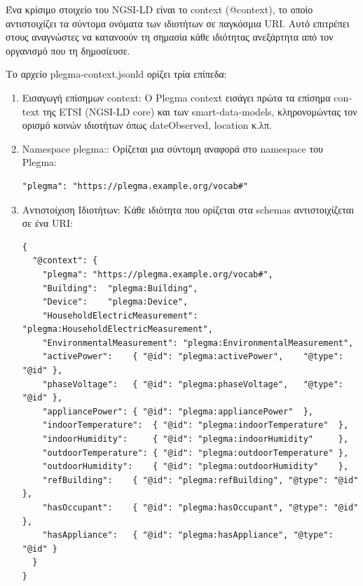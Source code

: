 Ένα κρίσιμο στοιχείο του \textlatin{NGSI-LD} είναι το \textlatin{context}
(\textlatin{@context}), το οποίο αντιστοιχίζει τα σύντομα ονόματα των
ιδιοτήτων σε παγκόσμια \textlatin{URI}. Αυτό επιτρέπει στους αναγνώστες
να κατανοούν τη σημασία κάθε ιδιότητας ανεξάρτητα από τον οργανισμό που τη
δημοσίευσε.

Το αρχείο \textlatin{plegma-context.jsonld} ορίζει τρία επίπεδα:

\begin{enumerate}
    \item Εισαγωγή επίσημων \textlatin{context}: Ο \textlatin{Plegma
    context} εισάγει πρώτα τα επίσημα \textlatin{context} της
    \textlatin{ETSI} (\textlatin{NGSI-LD core}) και των
    \textlatin{smart-data-models}, κληρονομώντας τον ορισμό κοινών
    ιδιοτήτων όπως \textlatin{dateObserved}, \textlatin{location} κ.λπ.

    \item \textlatin{Namespace} \textlatin{plegma:}: Ορίζεται μια
    σύντομη αναφορά στο \textlatin{namespace} του \textlatin{Plegma}:

\begin{lstlisting}[language={}]
"plegma": "https://plegma.example.org/vocab#"
\end{lstlisting}

    \item Αντιστοίχιση Ιδιοτήτων: Κάθε ιδιότητα που ορίζεται
    στα \textlatin{schemas} αντιστοιχίζεται σε ένα \textlatin{URI}:
\begin{lstlisting}[language={}, caption={Context mapping excerpt.}]
{
  "@context": {
    "plegma": "https://plegma.example.org/vocab#",
    "Building":  "plegma:Building",
    "Device":    "plegma:Device",
    "HouseholdElectricMeasurement": "plegma:HouseholdElectricMeasurement",
    "EnvironmentalMeasurement": "plegma:EnvironmentalMeasurement",
    "activePower":    { "@id": "plegma:activePower",    "@type": "@id" },
    "phaseVoltage":   { "@id": "plegma:phaseVoltage",   "@type": "@id" },
    "appliancePower": { "@id": "plegma:appliancePower"  },
    "indoorTemperature":  { "@id": "plegma:indoorTemperature"  },
    "indoorHumidity":     { "@id": "plegma:indoorHumidity"     },
    "outdoorTemperature": { "@id": "plegma:outdoorTemperature" },
    "outdoorHumidity":    { "@id": "plegma:outdoorHumidity"    },
    "refBuilding":    { "@id": "plegma:refBuilding", "@type": "@id" },
    "hasOccupant":    { "@id": "plegma:hasOccupant", "@type": "@id" },
    "hasAppliance":   { "@id": "plegma:hasAppliance", "@type": "@id" }
  }
}
\end{lstlisting}
\end{enumerate}

